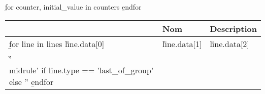 \b{for counter, initial_value in counters}
\b{endfor}

\small

\renewcommand\arraystretch{1.2}

\begin{spacing}{.9}
\setlength\LTleft{-.5in}
\setlength\LTright{-.5in}
\begin{tabularx}{1.15\linewidth}{@{}p{1.5cm} | p{6.5cm} X@{}}
\toprule
& \textbf{Nom} & \textbf{Description}\\\midrule\endhead
\b{for line in lines}
\v{line.data[0]} & \v{line.data[1]} & \v{line.data[2]}\\\v{'\\midrule' if line.type == 'last_of_group' else ''}
\b{endfor}\bottomrule
\end{tabularx}
\end{spacing}

